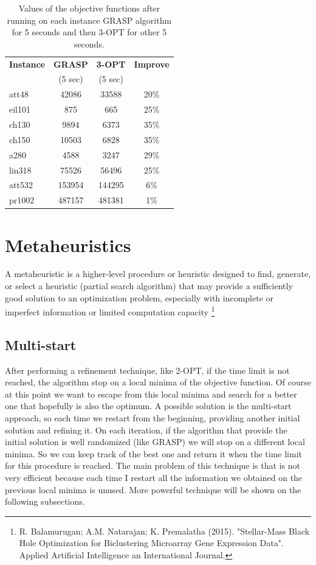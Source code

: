 \begin{table}[h!]
	\begin{center}
		\begin{tabular}{l|c|c|c}
			\textbf{Instance} & \textbf{GRASP} & \textbf{3-OPT} & \textbf{Improve}	\\
			& (5 sec) & (5 sec) & \\
			\hline
			att48 & 42086 & 33588 & 20\% \\
			eil101 & 875 & 665 & 25\% \\
			ch130 & 9894 & 6373 & 35\% \\
			ch150 & 10503 & 6828 & 35\% \\
			a280 & 4588 & 3247 & 29\% \\
			lin318 & 75526 & 56496 & 25\% \\ 
			att532 & 153954 & 144295 & 6\% \\	
			pr1002 & 487157 & 481381 & 1\% \\
		\end{tabular}
		\caption{Values of the objective functions after running on each instance GRASP algorithm for 5 seconds and then 3-OPT for other 5 seconds.}
	\end{center}
\end{table}

\newpage

\section{Metaheuristics}
A metaheuristic is a higher-level procedure or heuristic designed to find, generate, or select a heuristic (partial search algorithm) that may provide a sufficiently good solution to an optimization problem, especially with incomplete or imperfect information or limited computation capacity \footnote{R. Balamurugan; A.M. Natarajan; K. Premalatha (2015). "Stellar-Mass Black Hole Optimization for Biclustering Microarray Gene Expression Data". Applied Artificial Intelligence an International Journal.}


\subsection{Multi-start}
After performing a refinement technique, like 2-OPT, if the time limit is not reached, the algorithm stop on a local minima of the objective function. Of course at this point we want to escape from this local minima and search for a better one that hopefully is also the optimum. A possible solution is the multi-start approach, so each time we restart from the beginning, providing another initial solution and refining it. On each iteration, if the algorithm that provide the initial solution is well randomized (like GRASP) we will stop on a different local minima. So we can keep track of the best one and return it when the time limit for this procedure is reached.
The main problem of this technique is that is not very efficient because each time I restart all the information we obtained on the previous local minima is unused.
More powerful technique will be shown on the following subsections.

